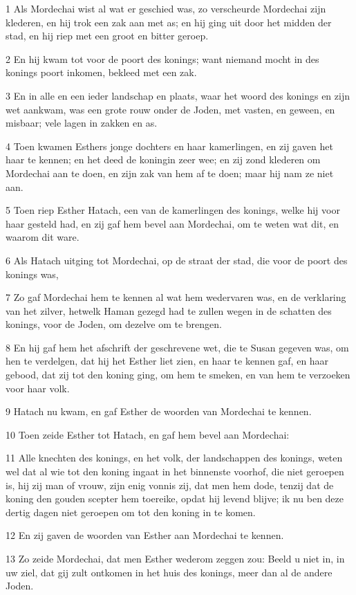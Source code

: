 \par 1 Als Mordechai wist al wat er geschied was, zo verscheurde Mordechai zijn klederen, en hij trok een zak aan met as; en hij ging uit door het midden der stad, en hij riep met een groot en bitter geroep.
\par 2 En hij kwam tot voor de poort des konings; want niemand mocht in des konings poort inkomen, bekleed met een zak.
\par 3 En in alle en een ieder landschap en plaats, waar het woord des konings en zijn wet aankwam, was een grote rouw onder de Joden, met vasten, en geween, en misbaar; vele lagen in zakken en as.
\par 4 Toen kwamen Esthers jonge dochters en haar kamerlingen, en zij gaven het haar te kennen; en het deed de koningin zeer wee; en zij zond klederen om Mordechai aan te doen, en zijn zak van hem af te doen; maar hij nam ze niet aan.
\par 5 Toen riep Esther Hatach, een van de kamerlingen des konings, welke hij voor haar gesteld had, en zij gaf hem bevel aan Mordechai, om te weten wat dit, en waarom dit ware.
\par 6 Als Hatach uitging tot Mordechai, op de straat der stad, die voor de poort des konings was,
\par 7 Zo gaf Mordechai hem te kennen al wat hem wedervaren was, en de verklaring van het zilver, hetwelk Haman gezegd had te zullen wegen in de schatten des konings, voor de Joden, om dezelve om te brengen.
\par 8 En hij gaf hem het afschrift der geschrevene wet, die te Susan gegeven was, om hen te verdelgen, dat hij het Esther liet zien, en haar te kennen gaf, en haar gebood, dat zij tot den koning ging, om hem te smeken, en van hem te verzoeken voor haar volk.
\par 9 Hatach nu kwam, en gaf Esther de woorden van Mordechai te kennen.
\par 10 Toen zeide Esther tot Hatach, en gaf hem bevel aan Mordechai:
\par 11 Alle knechten des konings, en het volk, der landschappen des konings, weten wel dat al wie tot den koning ingaat in het binnenste voorhof, die niet geroepen is, hij zij man of vrouw, zijn enig vonnis zij, dat men hem dode, tenzij dat de koning den gouden scepter hem toereike, opdat hij levend blijve; ik nu ben deze dertig dagen niet geroepen om tot den koning in te komen.
\par 12 En zij gaven de woorden van Esther aan Mordechai te kennen.
\par 13 Zo zeide Mordechai, dat men Esther wederom zeggen zou: Beeld u niet in, in uw ziel, dat gij zult ontkomen in het huis des konings, meer dan al de andere Joden.

